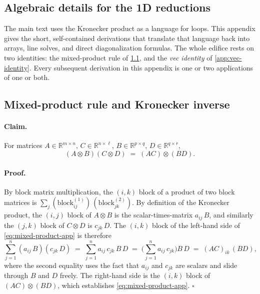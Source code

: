 \documentclass[11pt]{article}
\newcommand{\kron}{\otimes}
\newcommand{\R}{\mathbb{R}}
\begin{document}
\clearpage
\begin{appendices}

\section{Algebraic details for the 1D reductions}
\label{app:linalg}

The main text uses the Kronecker product as a language for loops.
This appendix gives the short, self-contained derivations that
translate that language back into arrays, line solves, and direct
diagonalization formulas.  The whole edifice rests on two identities:
the mixed-product rule of \cref{app:mixed-product}, and the
\emph{vec identity} of \cref{app:vec-identity}.  Every subsequent
derivation in this appendix is one or two applications of one or both.

\subsection{Mixed-product rule and Kronecker inverse}
\label{app:mixed-product}
\label{app:kron-inverse}

\paragraph{Claim.}
For matrices $A \in \R^{m \times n}$, $C \in \R^{n \times \ell}$,
$B \in \R^{p \times q}$, $D \in \R^{q \times r}$,
\begin{equation}
\label{eq:mixed-product-app}
  (A \kron B)(C \kron D) \;=\; (AC) \kron (BD).
\end{equation}

\paragraph{Proof.}
By block matrix multiplication, the $(i,k)$ block of a product of two
block matrices is $\sum_{j} (\text{block}_{ij}^{(1)})\,(\text{block}_{jk}^{(2)})$.
By definition of the Kronecker product, the $(i,j)$ block of
$A \kron B$ is the scalar-times-matrix $a_{ij}\,B$, and similarly the
$(j,k)$ block of $C \kron D$ is $c_{jk}\,D$.  The $(i,k)$ block of the
left-hand side of \eqref{eq:mixed-product-app} is therefore
\begin{equation*}
  \sum_{j=1}^{n} (a_{ij}\,B)(c_{jk}\,D)
  \;=\;
  \sum_{j=1}^{n} a_{ij}\, c_{jk}\, B\, D
  \;=\;
  \biggl(\sum_{j=1}^{n} a_{ij}\,c_{jk}\biggr) B\, D
  \;=\;
  (AC)_{ik}\,(BD),
\end{equation*}
where the second equality uses the fact that $a_{ij}$ and $c_{jk}$
are scalars and slide through $B$ and $D$ freely.  The right-hand
side is the $(i,k)$ block of $(AC) \kron (BD)$, which establishes
\eqref{eq:mixed-product-app}.  $\square$


\end{appendices}
\end{document}
